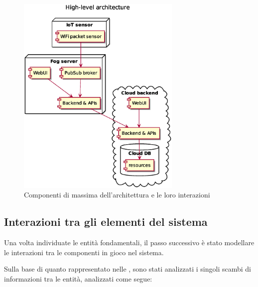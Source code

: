 \begin{figure}[H]
  \centering
  \includegraphics[width=0.7\textwidth]{res/out/architecture.eps}
  \caption{Componenti di massima dell'architettura e le loro interazioni}%
  \label{fig:architecture}
\end{figure}

\subsection{Interazioni tra gli elementi del sistema}\label{subsec:interaction}

Una volta individuate le entità fondamentali, il passo successivo è stato modellare le interazioni tra le componenti in gioco nel sistema.

Sulla base di quanto rappresentato nelle , sono stati analizzati i singoli scambi di informazioni tra le entità, analizzati come segue:

